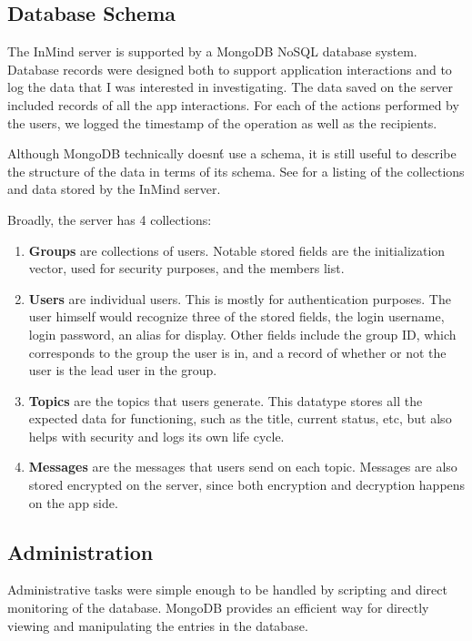     \subsection{Database Schema}
      The InMind server is supported by a MongoDB NoSQL database system.
      Database records were designed both to support application interactions
      and to log the data that I was interested in investigating.
      The data saved on the server included records of all the app interactions.
      For each of the actions performed by the users,
      we logged the timestamp of the operation as well as the recipients.

      Although MongoDB technically doesn\'t use a schema,
      it is still useful to describe the structure of the data in terms of its schema.
      See \cite{} for a listing of the collections and data stored by
      the InMind server.

      Broadly, the server has 4 collections:
      \begin{enumerate}
      \item \textbf{Groups} are collections of users.
        Notable stored fields are the initialization vector, used for security purposes,
        and the members list.
      \item \textbf{Users} are individual users.
        This is mostly for authentication purposes.
        The user himself would recognize three of the stored fields,
        the login username, login password, an alias for display.
        Other fields include the group ID, which corresponds to the group the user is in,
        and a record of whether or not the user is the lead user in the group.
      \item \textbf{Topics} are the topics that users generate.
        This datatype stores all the expected data for functioning,
        such as the title, current status, etc,
        but also helps with security and logs its own life cycle.
      \item \textbf{Messages} are the messages that users send on each topic.
        Messages are also stored encrypted on the server,
        since both encryption and decryption happens on the app side.
      \end{enumerate}

    \subsection{Administration}
      Administrative tasks were simple enough to be handled by scripting
      and direct monitoring of the database.
      MongoDB provides an efficient way for directly viewing
      and manipulating the entries in the database.

